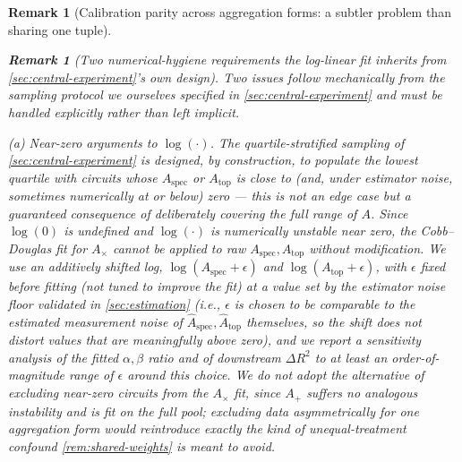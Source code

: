\documentclass[11pt]{article}
\newtheorem{remark}[theorem]{Remark}
\newcommand{\Aspec}{A_{\mathrm{spec}}}
\newcommand{\Atop}{A_{\mathrm{top}}}
\begin{document}
\begin{remark}[Calibration parity across aggregation forms: a subtler problem than sharing one tuple]
\begin{remark}[Two numerical-hygiene requirements the log-linear fit inherits from \cref{sec:central-experiment}'s own design]
\label{rem:log-hygiene}
Two issues follow mechanically from the sampling protocol we ourselves specified in \cref{sec:central-experiment} and must be handled explicitly rather than left implicit.

\emph{(a) Near-zero arguments to $\log(\cdot)$.} The quartile-stratified sampling of \cref{sec:central-experiment} is designed, by construction, to populate the lowest quartile with circuits whose $\Aspec$ or $\Atop$ is close to (and, under estimator noise, sometimes numerically at or below) zero --- this is not an edge case but a guaranteed consequence of deliberately covering the full range of $A$. Since $\log(0)$ is undefined and $\log(\cdot)$ is numerically unstable near zero, the Cobb--Douglas fit for $A_\times$ cannot be applied to raw $\Aspec,\Atop$ without modification. We use an additively shifted log, $\log(\Aspec+\epsilon)$ and $\log(\Atop+\epsilon)$, with $\epsilon$ fixed \emph{before} fitting (not tuned to improve the fit) at a value set by the estimator noise floor validated in \cref{sec:estimation} (i.e., $\epsilon$ is chosen to be comparable to the estimated measurement noise of $\hat\Aspec,\hat\Atop$ themselves, so the shift does not distort values that are meaningfully above zero), and we report a sensitivity analysis of the fitted $\alpha,\beta$ ratio and of downstream $\Delta R^2$ to at least an order-of-magnitude range of $\epsilon$ around this choice. We do not adopt the alternative of excluding near-zero circuits from the $A_\times$ fit, since $A_+$ suffers no analogous instability and is fit on the full pool; excluding data asymmetrically for one aggregation form would reintroduce exactly the kind of unequal-treatment confound \cref{rem:shared-weights} is meant to avoid.


\end{remark}
\end{remark}
\end{document}
